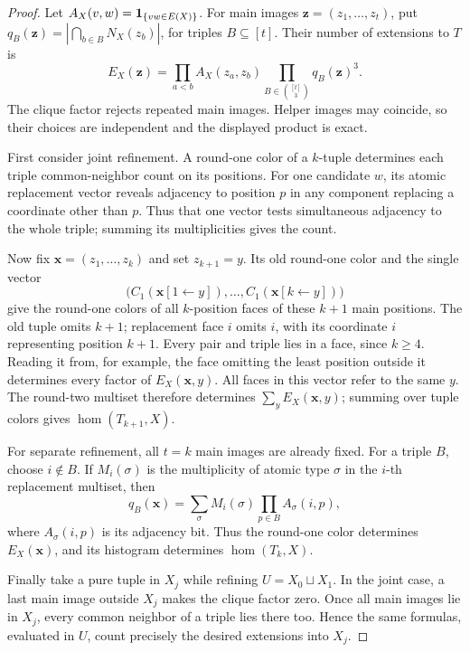 \begin{proof}
Let \(A_X(v,w)=\mathbf 1_{\{vw\in E(X)\}}\).
For main images \(\mathbf z=(z_1,\ldots,z_t)\), put
\(q_B(\mathbf z)=|\bigcap_{b\in B}N_X(z_b)|\), for triples \(B\subseteq[t]\).
Their number of extensions to \(T\) is
\[
 E_X(\mathbf z)=
       \prod_{a<b} A_X(z_a,z_b)
       \prod_{B\in\binom{[t]}3}q_B(\mathbf z)^3.
\]
The clique factor rejects repeated main images. Helper images may
coincide, so their choices are independent and the displayed product
is exact.

First consider joint refinement. A round-one color of a
\(k\)-tuple determines each triple common-neighbor count on its positions.
For one candidate \(w\), its atomic replacement vector reveals adjacency
to position \(p\) in any component replacing a coordinate other than \(p\).
Thus that one vector tests simultaneous adjacency to the whole triple;
summing its multiplicities gives the count.

Now fix \(\mathbf x=(z_1,\ldots,z_k)\) and set \(z_{k+1}=y\).
Its old round-one color and the single vector
\[
 \bigl(C_1(\mathbf x[1\leftarrow y]),\ldots,
       C_1(\mathbf x[k\leftarrow y])\bigr)
\]
give the round-one colors of all \(k\)-position faces of these \(k+1\)
main positions. The old tuple omits \(k+1\); replacement face \(i\)
omits \(i\), with its coordinate \(i\) representing position \(k+1\).
Every pair and triple lies in a face, since \(k\ge4\).
Reading it from, for example, the face omitting the least position
outside it determines every factor of \(E_X(\mathbf x,y)\).
All faces in this vector refer to the same \(y\).
The round-two multiset therefore determines
\(\sum_y E_X(\mathbf x,y)\); summing over tuple colors gives
\(\hom(T_{k+1},X)\).

For separate refinement, all \(t=k\) main images are already fixed.
For a triple \(B\), choose \(i\notin B\). If \(M_i(\sigma)\) is the
multiplicity of atomic type \(\sigma\) in the \(i\)-th replacement
multiset, then
\[
 q_B(\mathbf x)=\sum_\sigma M_i(\sigma)
                    \prod_{p\in B} A_\sigma(i,p),
\]
where \(A_\sigma(i,p)\) is its adjacency bit.
Thus the round-one color determines \(E_X(\mathbf x)\), and its
histogram determines \(\hom(T_k,X)\).

Finally take a pure tuple in \(X_j\) while refining \(U=X_0\sqcup X_1\).
In the joint case, a last main image outside \(X_j\) makes the
clique factor zero. Once all main images lie in \(X_j\), every common
neighbor of a triple lies there too. Hence the same formulas, evaluated
in \(U\), count precisely the desired extensions into \(X_j\).
\end{proof}
